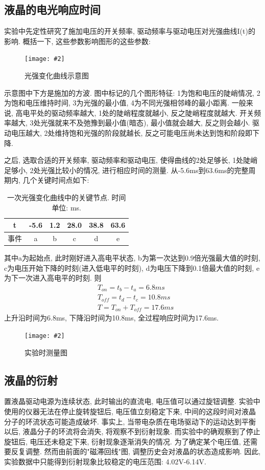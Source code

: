 \documentclass[12pt,a4paper]{article}
\newcommand{\bfig}[3]{
    \begin{figure}[H]
        \centering
        \texttt{[image: \#2]}
        \caption{#3}
    \end{figure}
}
\begin{document}
\subsection{液晶的电光响应时间}
实验中先定性研究了施加电压的开关频率, 驱动频率与驱动电压对光强曲线I(t)的影响. 概括一下, 这些参数影响图形的这些参数: 
\bfig{0.7}{响应时间.jpg}{光强变化曲线示意图}
示意图中下方是施加的方波. 图中标记的几个图形特征: 1为饱和电压的陡峭情况, 2为饱和电压维持时间, 3为光强的最小值, 4为不同光强相邻峰的最小距离. 
一般来说, 高电平处的驱动频率越大, 1处的陡峭程度就越小, 反之陡峭程度就越大. 开关频率越大, 3处光强就来不及弛豫到最小值(暗态), 最小值就会越大, 反之则会越小. 驱动电压越大, 2处维持饱和光强的阶段就越长, 反之可能电压尚未达到饱和阶段即下降. 

之后, 选取合适的开关频率, 驱动频率和驱动电压, 使得曲线的2处足够长, 1处陡峭足够小, 2处光强比较小的情况, 进行相应时间的测量. 从-5.6ms到63.6ms的完整周期内, 几个关键时间点如下: 
\begin{table}[H]
    \centering
    \begin{tabular}{|c|c|c|c|c|c|}
    \hline
    t&-5.6 & 1.2 & 28.0 & 38.8 & 63.6 \\ \hline
    事件&a    & b   & c  & d    & e    \\ \hline
    \end{tabular}
    \caption{一次光强变化曲线中的关键节点. 时间单位: ms. }
    \end{table}
其中a为起始点, 此时刚好进入高电平状态, b为第一次达到0.9倍光强最大值的时刻, c为电压开始下降的时刻(进入低电平的时刻), d为电压下降到0.1倍最大值的时刻, e为下一次进入高电平的时刻. 
则
\begin{align}
&T_{on}=t_{b}-t_{a}=6.8ms\\
&T_{off}=t_{d}-t_{c}=10.8ms\\
&T=T_{on}+T_{off}=17.6ms
\end{align}
上升沿时间为6.8ms, 下降沿时间为10.8ms, 全过程响应时间为17.6ms. 
\bfig{0.5}{响应时间示意.jpg}{实验时测量图}
\subsection{液晶的衍射}
置液晶驱动电源为连续状态, 此时输出的直流电, 电压值可以通过旋钮调整. 实验中使用的仪器无法在停止旋转旋钮后, 电压值立刻稳定下来, 中间的这段时间对液晶分子的环流状态可能造成破坏. 事实上, 当带电杂质在电场驱动下的运动达到平衡以后, 液晶分子的环流将会消失, 将观察不到衍射现象. 
而实验中的确观察到了停止旋钮后, 电压还未稳定下来, 衍射现象逐渐消失的情况. 为了确定某个电压值, 还需要反复调整. 然而由前面的"磁滞回线"图, 调整历史会对液晶的状态造成影响. 因此, 实验数据中只能得到衍射现象比较稳定的电压范围: 4.02V-6.14V. 
\end{document}
